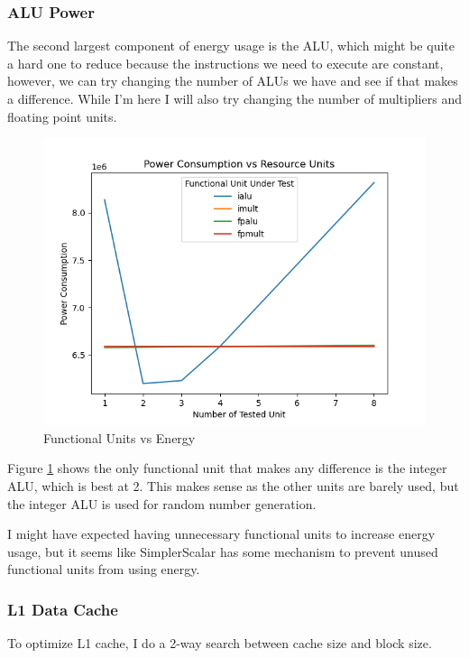 \documentclass{article}
\newcommand{\optimisation}[1]{
  
}
\begin{document}
\begin{multicols}{2}
  \subsubsection{ALU Power}
  The second largest component of energy usage is the ALU, which might be quite a hard one to reduce because the instructions we need to execute are constant, however, we can try changing the number of ALUs we have and see if that makes a difference. While I'm here I will also try changing the number of multipliers and floating point units.\begin{figure}[H]

    \centering
    \includegraphics[width=\linewidth]{./assets/units_vs_energy.png}
    \caption{Functional Units vs Energy}
    \label{fig:units_vs_energy}
  \end{figure}

  Figure \ref{fig:units_vs_energy} shows the only functional unit that makes any difference is the integer ALU, which is best at 2. This makes sense as the other units are barely used, but the integer ALU is used for random number generation.

  \optimisation{reduce_ialu}

  I might have expected having unnecessary functional units to increase energy usage, but it seems like SimplerScalar has some mechanism to prevent unused functional units from using energy.

  \subsubsection{L1 Data Cache}
  To optimize L1 cache, I do a 2-way search between cache size and block size.


\end{multicols}
\end{document}
